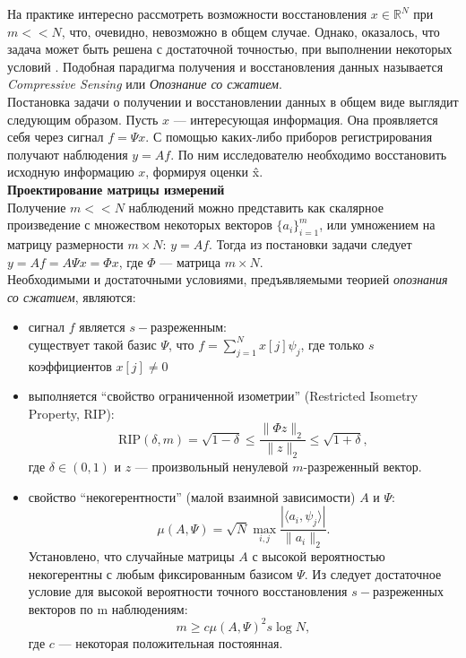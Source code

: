 \documentclass[14pt]{matmex-diploma}
\begin{document}
На практике интересно рассмотреть возможности восстановления $x \in \mathbb{R}^N$ при $m << N$, что, очевидно, невозможно в общем случае. Однако, оказалось, что задача может быть решена с достаточной точностью, при выполнении некоторых условий \cite{donoho2006compressed}. Подобная парадигма получения и восстановления данных называется \textit{Compressive Sensing} или \textit{Опознание со сжатием}. \\

Постановка задачи о получении и восстановлении данных в общем виде выглядит следующим образом. Пусть $x$ --- интересующая информация. Она проявляется себя через сигнал $f = \Psi x$. С помощью каких-либо приборов регистрирования получают наблюдения $y = A f$. По ним исследователю необходимо восстановить исходную информацию $x$, формируя оценки \^{x}. \\

\textbf{Проектирование матрицы измерений}\\

Получение $m << N$ наблюдений можно представить как скалярное произведение с множеством некоторых векторов $\{a_i\}_{i=1}^m$, или умножением на матрицу размерности $m\times N$: $y= A f$. Тогда из постановки задачи следует $y=A f = A \Psi x = \Phi x$, где $\Phi$ --- матрица $m \times N$. \\

Необходимыми и достаточными условиями, предъявляемыми теорией \textit{опознания со сжатием}, являются:
\begin{itemize}
\item сигнал $f$ является $s-$разреженным: \\существует такой базис $\Psi$, что $f = \sum_{j=1}^N x[j] \psi_j$, где только $s$ коэффициентов $x[j]\neq 0$
\item выполняется ``свойство ограниченной изометрии'' (Restricted Isometry Property, RIP):
$$\text{RIP}(\delta, m)= \sqrt{1 - \delta} \leq \frac{\| \Phi z \|_2}{\| z\|_2} \leq \sqrt{1 + \delta},$$ 
где $\delta \in (0,1)$ и $z$ --- произвольный ненулевой $m$-разреженный вектор.

\item свойство ``некогерентности'' (малой взаимной зависимости) $A$ и $\Psi$:
$$\mu (A, \Psi) = \sqrt{N} \max_{i,j}\frac{|\langle a_i, \psi_j\rangle |}{\| a_i\|_2}.$$
Установлено, что случайные матрицы $A$ с высокой вероятностью некогерентны с любым фиксированным базисом $\Psi$.
Из \cite{candes2007sparsity} следует достаточное условие для высокой вероятности точного восстановления $s-$разреженных векторов по m наблюдениям:
\begin{equation}m \geq c \mu (A,\Psi)^2 s \log{N}, \end{equation}
где $c$ --- некоторая положительная постоянная.
\end{itemize}
\end{document}
